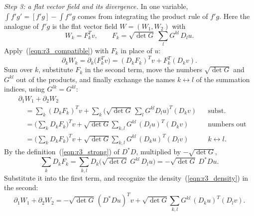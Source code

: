 \emph{Step 3: a flat vector field and its divergence.} In one variable, $\int f'g' = [f'g] - \int f''g$ comes from integrating the product rule of $f'g$. Here the analogue of $f'g$ is the flat vector field $W = (W_1, W_2)$ with
\begin{equation*}
W_k = F_k^Tv, \qquad F_k = \sqrt{\det G}\;\sum_l G^{kl}\, D_lu .
\end{equation*}
Apply~(\ref{eqn:r3_compatible}) with $F_k$ in place of $u$:
\begin{equation*}
\partial_k W_k = \partial_k\big(F_k^Tv\big) = (D_kF_k)^Tv + F_k^T(D_kv) .
\end{equation*}
Sum over $k$, substitute $F_k$ in the second term, move the numbers $\sqrt{\det G}$ and $G^{kl}$ out of the products, and finally exchange the names $k \leftrightarrow l$ of the summation indices, using $G^{lk} = G^{kl}$:
\begin{align*}
&\partial_1 W_1 + \partial_2 W_2 \\
&\quad= \sum_k (D_k F_k)^Tv + \sum_k \Big(\sqrt{\det G}\,\sum_l G^{kl}D_lu\Big)^T(D_kv) && \text{subst.} \\
&\quad= \Big(\sum_k D_k F_k\Big)^Tv + \sqrt{\det G}\sum_{k,l} G^{kl}\,(D_lu)^T(D_kv) && \text{numbers out} \\
&\quad= \Big(\sum_k D_k F_k\Big)^Tv + \sqrt{\det G}\sum_{k,l} G^{kl}\,(D_ku)^T(D_lv) && k \leftrightarrow l .
\end{align*}
By the definition~(\ref{eqn:r3_strong}) of $D^*D$, multiplied by $-\sqrt{\det G}$,
\begin{equation*}
\sum_k D_kF_k = \sum_{k,l} D_k\Big(\sqrt{\det G}\; G^{kl}\, D_lu\Big) = -\sqrt{\det G}\; D^*Du .
\end{equation*}
Substitute it into the first term, and recognize the density~(\ref{eqn:r3_density}) in the second:
\begin{equation}
\label{eqn:s3a_divW}
\partial_1 W_1 + \partial_2 W_2 = -\sqrt{\det G}\,(D^*Du)^Tv + \sqrt{\det G}\sum_{k,l} G^{kl}\,(D_ku)^T(D_lv) .
\end{equation}

